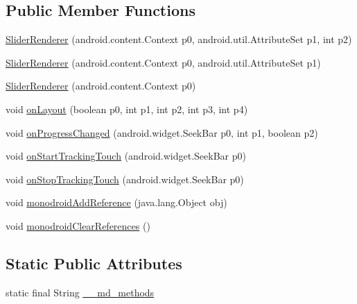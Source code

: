 \subsection*{Public Member Functions}
\begin{CompactItemize}
\item 
\hyperlink{classmd5b60ffeb829f638581ab2bb9b1a7f4f3f_1_1_slider_renderer_c4a155c9357e2f48baece33e8590b462}{SliderRenderer} (android.content.Context p0, android.util.AttributeSet p1, int p2)
\item 
\hyperlink{classmd5b60ffeb829f638581ab2bb9b1a7f4f3f_1_1_slider_renderer_a6d32149e1dbf9076af62a46ae72331f}{SliderRenderer} (android.content.Context p0, android.util.AttributeSet p1)
\item 
\hyperlink{classmd5b60ffeb829f638581ab2bb9b1a7f4f3f_1_1_slider_renderer_fe6177683ec0ebd537f6aa0d703bf526}{SliderRenderer} (android.content.Context p0)
\item 
void \hyperlink{classmd5b60ffeb829f638581ab2bb9b1a7f4f3f_1_1_slider_renderer_fac38e4eaa408c22962aa4a88025b986}{onLayout} (boolean p0, int p1, int p2, int p3, int p4)
\item 
void \hyperlink{classmd5b60ffeb829f638581ab2bb9b1a7f4f3f_1_1_slider_renderer_8749343787854a49aedab1eb23f1b5fd}{onProgressChanged} (android.widget.SeekBar p0, int p1, boolean p2)
\item 
void \hyperlink{classmd5b60ffeb829f638581ab2bb9b1a7f4f3f_1_1_slider_renderer_94e46916cabbb945547dd03b6915531b}{onStartTrackingTouch} (android.widget.SeekBar p0)
\item 
void \hyperlink{classmd5b60ffeb829f638581ab2bb9b1a7f4f3f_1_1_slider_renderer_7311d722d790861ea5026d332a612245}{onStopTrackingTouch} (android.widget.SeekBar p0)
\item 
void \hyperlink{classmd5b60ffeb829f638581ab2bb9b1a7f4f3f_1_1_slider_renderer_52c4922dec0b09c2a4d75e7488624539}{monodroidAddReference} (java.lang.Object obj)
\item 
void \hyperlink{classmd5b60ffeb829f638581ab2bb9b1a7f4f3f_1_1_slider_renderer_9db5ee8d3adfe5077ce514f56e2a5984}{monodroidClearReferences} ()
\end{CompactItemize}
\subsection*{Static Public Attributes}
\begin{CompactItemize}
\item 
static final String \hyperlink{classmd5b60ffeb829f638581ab2bb9b1a7f4f3f_1_1_slider_renderer_bd36f56a20d51aa82400faf5b2db4536}{\_\-\_\-md\_\-methods}
\end{CompactItemize}
